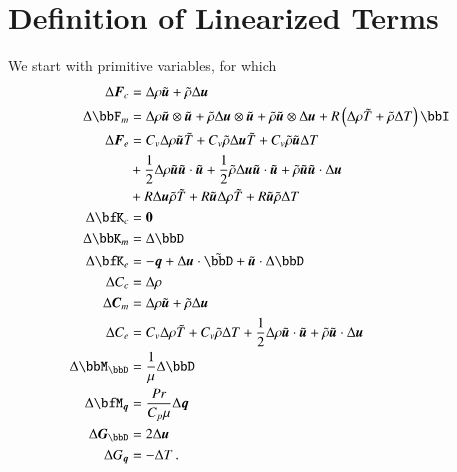 \documentclass[preprint,12pt]{elsarticle}
\begin{document}

\appendix

\section{Definition of Linearized Terms}
\label{ap:linearization}

We start with primitive variables, for which
\begin{align*}
\Delta\bfF_c&=\Delta\rho\tilde\bfu+\tilde\rho\Delta\bfu\\
\Delta\bbF_m&=\Delta\rho\tilde\bfu\otimes\tilde\bfu+\tilde\rho\Delta\bfu\otimes\tilde\bfu+\tilde\rho\tilde\bfu\otimes\Delta\bfu
+R\LRp{\Delta\rho\tilde T+\tilde\rho\Delta T}\bbI\\
\Delta\bfF_e&=C_v\Delta\rho\tilde\bfu\tilde T+C_v\tilde\rho\Delta\bfu\tilde T+C_v\tilde\rho\tilde\bfu\Delta T\\
&+\frac{1}{2}\Delta\rho\tilde\bfu\tilde\bfu\cdot\tilde\bfu
+\frac{1}{2}\tilde\rho\Delta\bfu\tilde\bfu\cdot\tilde\bfu
+\tilde\rho\tilde\bfu\tilde\bfu\cdot\Delta\bfu\\
&+R\Delta\bfu\tilde\rho\tilde T
+R\tilde\bfu\Delta\rho\tilde T
+R\tilde\bfu\tilde\rho\Delta T\\
\Delta\bfK_c&=\bs0\\
\Delta\bbK_m&=\Delta\bbD\\
\Delta\bfK_e&=-\bfq+\Delta\bfu\cdot\tilde\bbD+\tilde\bfu\cdot\Delta\bbD\\
\Delta C_c&=\Delta\rho\\
\Delta\bfC_m&=\Delta\rho\tilde\bfu+\tilde\rho\Delta\bfu\\
\Delta C_e&=C_v\Delta\rho\tilde T+C_v\tilde\rho\Delta T
+\frac{1}{2}\Delta\rho\tilde\bfu\cdot\tilde\bfu+\tilde\rho\tilde\bfu\cdot\Delta\bfu\\
\Delta \bbM_\bbD&=\frac{1}{\mu}\Delta \bbD\\
\Delta \bfM_{\bfq}&=\frac{Pr}{C_p\mu}\Delta\bfq\\
\Delta \bfG_\bbD&=2\Delta\bfu\\
\Delta G_{\bfq}&=-\Delta T\,.
\end{align*}
\end{document}

